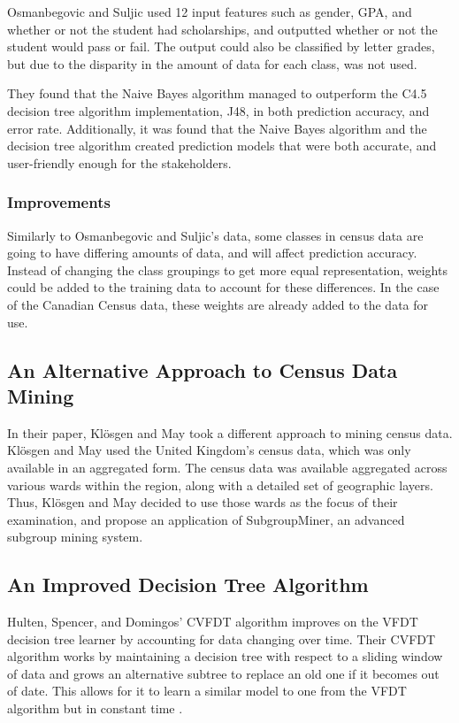 \documentclass[10pt, conference, compsocconf]{IEEEtran}
\begin{document}
Osmanbegovic and Suljic used 12 input features such as gender, GPA, and whether or not the student had scholarships, and outputted whether or not the student would pass or fail. The output could also be classified by letter grades, but due to the disparity in the amount of data for each class, was not used. \cite{performance1}

They found that the Naive Bayes algorithm managed to outperform the C4.5 decision tree algorithm implementation, J48, in both prediction accuracy, and error rate. Additionally, it was found that the Naive Bayes algorithm and the decision tree algorithm created prediction models that were both accurate, and user-friendly enough for the stakeholders. \cite{performance1}

\subsubsection{Improvements}
Similarly to Osmanbegovic and Suljic's data, some classes in census data are going to have differing amounts of data, and will affect prediction accuracy. Instead of changing the class groupings to get more equal representation, weights could be added to the training data to account for these differences. In the case of the Canadian Census data, these weights are already added to the data for use.

\subsection{An Alternative Approach to Census Data Mining}
In their paper, Klösgen and May took a different approach to mining census data. Klösgen and May used the United Kingdom's census data, which was only available in an aggregated form. The census data was available aggregated across various wards within the region, along with a detailed set of geographic layers. Thus, Klösgen and May decided to use those wards as the focus of their examination, and propose an application of SubgroupMiner, an advanced subgroup mining system. \cite{census1}

\subsection{An Improved Decision Tree Algorithm}
Hulten, Spencer, and Domingos' CVFDT algorithm improves on the VFDT decision tree learner by accounting for data changing over time. \cite{dtrees1} Their CVFDT algorithm works by maintaining a decision tree with respect to a sliding window of data and grows an alternative subtree to replace an old one if it becomes out of date. This allows for it to learn a similar model to one from the VFDT algorithm but in constant time \cite{dtrees1}.
\end{document}
